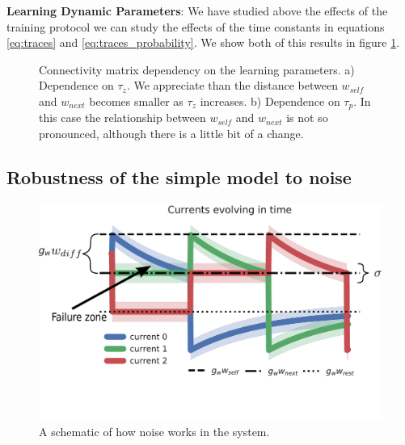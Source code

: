 \documentclass[10pt,a4paper]{article}
\begin{document}
\textbf{Learning Dynamic Parameters}:
We have studied above the effects of the training protocol we can study the effects of the time constants in equations \ref{eq:traces} and \ref{eq:traces_probability}. We show both of this results in figure \ref{fig:simple_bcpnn_learning_tau}. 

\begin{figure}[H]%
    \centering
    \qquad
    \caption{Connectivity matrix dependency on the learning parameters. a) Dependence on $\tau_z$. We appreciate than the distance between $w_{self}$ and $w_{next}$ becomes smaller as $\tau_z$ increases. b) Dependence on $\tau_p$. In this case the relationship between $w_{self}$ and $w_{next}$ is not so pronounced, although there is a little bit of a change. }
    \label{fig:simple_bcpnn_learning_tau}%
\end{figure}

\subsection{Robustness of the simple model to noise}

\begin{figure}[H]
\centering
\includegraphics[scale=0.55]{noise_diagram.pdf}
\caption{A schematic of how noise works in the system.}
\label{fig:noise_diagram}

\end{figure}
\end{document}
